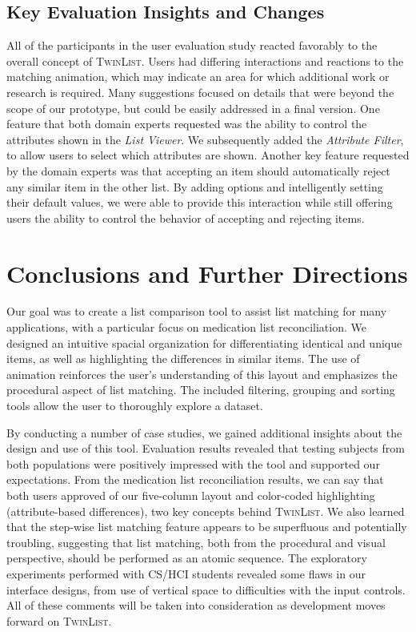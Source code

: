 \documentclass{chi2009}
\newcommand{\TwinList}{\textsc{TwinList}}
\newcommand{\ListViewer}{\textit{List Viewer}}
\newcommand{\AttributeFilter}{\textit{Attribute Filter}}
\begin{document}
\subsection{Key Evaluation Insights and Changes}
All of the participants in the user evaluation study reacted favorably to the overall concept of \TwinList. Users had differing interactions and reactions to the matching animation, which may indicate an area for which additional work or research is required. Many suggestions focused on details that were beyond the scope of our prototype, but could be easily addressed in a final version. One feature that both domain experts requested was the ability to control the attributes shown in the \ListViewer. We subsequently added the \AttributeFilter, to allow users to select which attributes are shown. Another key feature requested by the domain experts was that accepting an item should automatically reject any similar item in the other list. By adding options and intelligently setting their default values, we were able to provide this interaction while still offering users the ability to control the behavior of accepting and rejecting items. 

\section{Conclusions and Further Directions}
Our goal was to create a list comparison tool to assist list matching for many applications, with a particular focus on medication list reconciliation. We designed an intuitive spacial organization for differentiating identical and unique items, as well as highlighting the differences in similar items. The use of animation reinforces the user's understanding of this layout and emphasizes the procedural aspect of list matching. The included filtering, grouping and sorting tools allow the user to thoroughly explore a dataset.

By conducting a number of case studies, we gained additional insights about the design and use of this tool. Evaluation results revealed that testing subjects from both populations were positively impressed with the tool and supported our expectations. From the medication list reconciliation results, we can say that both users approved of our five-column layout and color-coded highlighting (attribute-based differences), two key concepts behind \TwinList. We also learned that the step-wise list matching feature appears to be superfluous and potentially troubling, suggesting that list matching, both from the procedural and visual perspective, should be performed as an atomic sequence. The exploratory experiments performed with CS/HCI students revealed some flaws in our interface designs, from use of vertical space to difficulties with the input controls. All of these comments will be taken into consideration as development moves forward on \TwinList.
 
\end{document}
